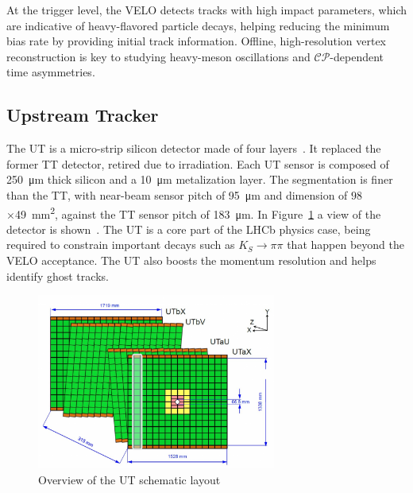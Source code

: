 At the trigger level, the VELO detects tracks with high impact parameters, which are indicative of heavy-flavored particle decays, helping reducing the minimum bias rate by providing initial track information. Offline, high-resolution vertex reconstruction is key to studying heavy-meson oscillations and $\mathcal{CP}$-dependent time asymmetries.
\subsection{Upstream Tracker}
The UT is a micro-strip silicon detector made of four layers~\cite{LHCb:2014uqj}. It replaced the former TT detector, retired due to irradiation. Each UT sensor is composed of \SI{250}{\micro\meter} thick silicon and a \SI{10}{\micro\meter} metalization layer. The segmentation is finer than the TT, with near-beam sensor pitch of \SI{95}{\micro\meter} and dimension of $98$×\SI{49}{\milli\meter\squared}, against the TT sensor pitch of \SI{183}{\micro\meter}. In Figure~\ref{fig:UT} a view of the detector is shown~\cite{ut}. 
The UT is a core part of the LHCb physics case, being required to constrain important decays such as $K_S \rightarrow\pi\pi$ that happen beyond the VELO acceptance. The UT also boosts the momentum resolution and helps identify ghost tracks.

\begin{figure}
    \centering
    \includegraphics[width=0.7\textwidth]{figures/UT.png}
    \caption{Overview of the UT schematic layout}
    \label{fig:UT}
\end{figure}

